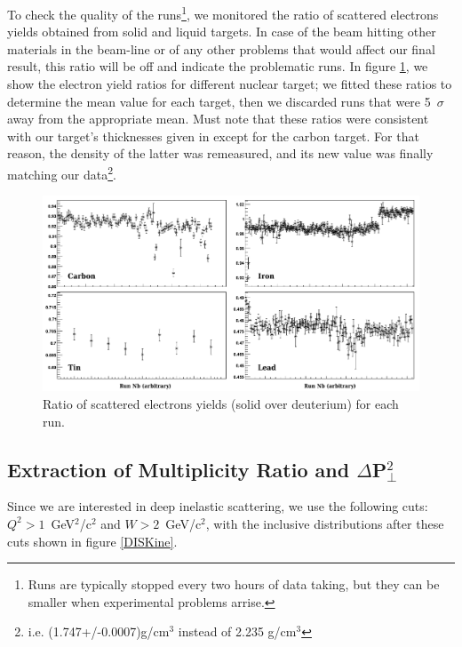 To check the quality of the runs\footnote{Runs are typically stopped every two hours
of data taking, but they can be smaller when experimental problems arrise.}, we 
monitored the ratio of scattered electrons yields obtained from solid and liquid 
targets. In case of the beam hitting other materials in the beam-line or of any 
other problems that would affect our final result, 
this ratio will be off and indicate the problematic runs. In figure 
\ref{DataQ}, we show the electron yield ratios for different nuclear target; we 
fitted these ratios to determine the mean value for each target, then we discarded 
runs that were 5~$\sigma$ away from the appropriate mean. Must note that these 
ratios were consistent with our target's thicknesses given in \cite{Hakobyan:2008zz} 
except for the carbon target. For that reason, the density of the latter was 
remeasured, and its new value was finally matching our 
data\footnote{i.e. (1.747+/-0.0007)g/cm$^3$ instead of 2.235 g/cm$^3$}.

\begin{figure}[tbp]
\centering
\includegraphics[width=15cm] {chap5-fig/TargetElRatio.png}
\caption {Ratio of scattered electrons yields (solid over deuterium) for each run.}
\label{DataQ}
\end{figure}


\subsection{Extraction of Multiplicity Ratio and $\Delta$P$_\perp^2$}
\label{sec:obs}

Since we are interested in deep inelastic scattering, we use the following 
cuts: $Q^2 > 1$~GeV$^2$/c$^2$ and $W > 2$~GeV/c$^2$, with the inclusive distributions
after these cuts shown in figure \ref{DISKine}.


